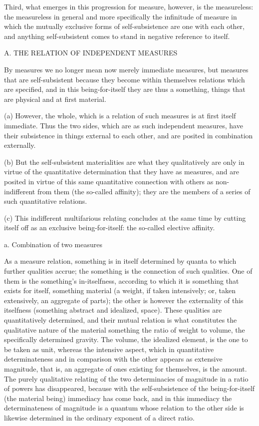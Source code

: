 Third, what emerges in this progression for measure, however,
is the measureless:
the measureless in general and more specifically
the infinitude of measure in which the mutually exclusive
forms of self-subsistence are one with each other,
and anything self-subsistent comes to stand
in negative reference to itself.

A. THE RELATION OF INDEPENDENT MEASURES

By measures we no longer mean now merely immediate measures,
but measures that are self-subsistent
because they become within themselves
relations which are specified,
and in this being-for-itself they are thus
a something, things that are physical and at first material.

(a) However, the whole, which is a relation of such measures
is at first itself immediate.
Thus the two sides, which are as such independent measures,
have their subsistence in things external to each other,
and are posited in combination externally.

(b) But the self-subsistent materialities are
what they qualitatively are only in virtue of
the quantitative determination that they have as measures,
and are posited in virtue of this same quantitative connection
with others as non-indifferent from them (the so-called affinity);
they are the members of a series of such quantitative relations.

(c) This indifferent multifarious relating concludes
at the same time by cutting itself off as
an exclusive being-for-itself:
the so-called elective affinity.

a. Combination of two measures

As a measure relation, something is in itself determined by
quanta to which further qualities accrue;
the something is the connection of such qualities.
One of them is the something's in-itselfness,
according to which it is something
that exists for itself, something material
(a weight, if taken intensively;
or, taken extensively, an aggregate of parts);
the other is however the externality of this itselfness
(something abstract and idealized, space).
These qualities are quantitatively determined,
and their mutual relation is what constitutes
the qualitative nature of the material something
the ratio of weight to volume, the specifically determined gravity.
The volume, the idealized element, is the one to be taken as unit,
whereas the intensive aspect,
which in quantitative determinateness
and in comparison with the other appears as extensive magnitude,
that is, an aggregate of ones existing for themselves, is the amount.
The purely qualitative relating of the two determinacies
of magnitude in a ratio of powers has disappeared,
because with the self-subsistence of the being-for-itself
(the material being) immediacy has come back,
and in this immediacy the determinateness
of magnitude is a quantum whose relation to the other side is likewise
determined in the ordinary exponent of a direct ratio.

